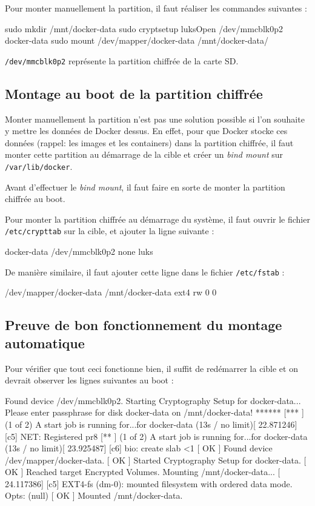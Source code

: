 \documentclass[11pt,a4paper,oneside]{report}
\newcommand{\code}[1]{\texttt{#1}}
\begin{document}
Pour monter manuellement la partition, il faut réaliser les commandes suivantes : 
\begin{bashcode}
sudo mkdir /mnt/docker-data
sudo cryptsetup luksOpen /dev/mmcblk0p2 docker-data
sudo mount /dev/mapper/docker-data /mnt/docker-data/
\end{bashcode}

\code{/dev/mmcblk0p2} représente la partition chiffrée de la carte SD.

\subsection{Montage au boot de la partition chiffrée}
Monter manuellement la partition n'est pas une solution possible si l'on souhaite y mettre les données de Docker dessus. En effet, pour que Docker stocke ces données (rappel: les images et les containers) dans la partition chiffrée, il faut monter cette partition au démarrage de la cible et créer un \textit{bind mount} sur \code{/var/lib/docker}. 


Avant d'effectuer le \textit{bind mount}, il faut faire en sorte de monter la partition chiffrée au boot.


Pour monter la partition chiffrée au démarrage du système, il faut ouvrir le fichier \code{/etc/crypttab} sur la cible, et ajouter la ligne suivante :
\begin{bashcode}
docker-data /dev/mmcblk0p2  none luks
\end{bashcode}

De manière similaire, il faut ajouter cette ligne dans le fichier \code{/etc/fstab} : 
\begin{bashcode}
/dev/mapper/docker-data /mnt/docker-data ext4 rw 0 0
\end{bashcode}


\subsection{Preuve de bon fonctionnement du montage automatique}
Pour vérifier que tout ceci fonctionne bien, il suffit de redémarrer la cible et on devrait observer les lignes suivantes au boot :

\begin{bashcode}
[  OK  ] Found device /dev/mmcblk0p2.
         Starting Cryptography Setup for docker-data...
Please enter passphrase for disk docker-data on /mnt/docker-data! ******
[***   ] (1 of 2) A start job is running for...for docker-data (13s / no limit)[   22.871246] [c5] NET: Registered pr8
[**    ] (1 of 2) A start job is running for...for docker-data (13s / no limit)[   23.925487] [c6] bio: create slab <1
[  OK  ] Found device /dev/mapper/docker-data.
[  OK  ] Started Cryptography Setup for docker-data.
[  OK  ] Reached target Encrypted Volumes.
         Mounting /mnt/docker-data...
[   24.117386] [c5] EXT4-fs (dm-0): mounted filesystem with ordered data mode. Opts: (null)
[  OK  ] Mounted /mnt/docker-data.
\end{bashcode}
\end{document}
